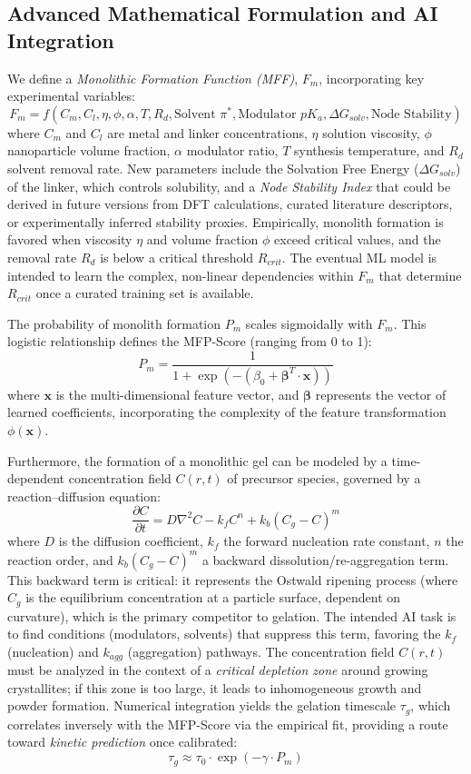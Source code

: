 \documentclass[12pt,a4paper]{article}
\begin{document}
\subsection{Advanced Mathematical Formulation and AI Integration}

We define a \textit{Monolithic Formation Function (MFF)}, $F_m$, incorporating key experimental variables:
\[
F_m = f(C_m, C_l, \eta, \phi, \alpha, T, R_d, \text{Solvent } \pi^*, \text{Modulator } pK_a, \Delta G_{solv}, \text{Node Stability})
\]
where $C_m$ and $C_l$ are metal and linker concentrations, $\eta$ solution viscosity, $\phi$ nanoparticle volume fraction, $\alpha$ modulator ratio, $T$ synthesis temperature, and $R_d$ solvent removal rate. New parameters include the Solvation Free Energy ($\Delta G_{solv}$) of the linker, which controls solubility, and a \textit{Node Stability Index} that could be derived in future versions from DFT calculations, curated literature descriptors, or experimentally inferred stability proxies. Empirically, monolith formation is favored when viscosity $\eta$ and volume fraction $\phi$ exceed critical values, and the removal rate $R_d$ is below a critical threshold $R_{crit}$. The eventual ML model is intended to learn the complex, non-linear dependencies within $F_m$ that determine $R_{crit}$ once a curated training set is available.

The probability of monolith formation $P_m$ scales sigmoidally with $F_m$. This logistic relationship defines the MFP-Score (ranging from 0 to 1):
\[
P_m = \frac{1}{1 + \exp(-(\beta_0 + \mathbf{\beta}^T \cdot \mathbf{x}))}
\]
where $\mathbf{x}$ is the multi-dimensional feature vector, and $\mathbf{\beta}$ represents the vector of learned coefficients, incorporating the complexity of the feature transformation $\phi(\mathbf{x})$.

Furthermore, the formation of a monolithic gel can be modeled by a time-dependent concentration field $C(r, t)$ of precursor species, governed by a reaction–diffusion equation:
\[
\frac{\partial C}{\partial t} = D \nabla^2 C - k_f C^n + k_b(C_g - C)^m
\]
where $D$ is the diffusion coefficient, $k_f$ the forward nucleation rate constant, $n$ the reaction order, and $k_b(C_g - C)^m$ a backward dissolution/re-aggregation term. This backward term is critical: it represents the Ostwald ripening process (where $C_g$ is the equilibrium concentration at a particle surface, dependent on curvature), which is the primary competitor to gelation. The intended AI task is to find conditions (modulators, solvents) that suppress this term, favoring the $k_f$ (nucleation) and $k_{agg}$ (aggregation) pathways. The concentration field $C(r, t)$ must be analyzed in the context of a \textit{critical depletion zone} around growing crystallites; if this zone is too large, it leads to inhomogeneous growth and powder formation. Numerical integration yields the gelation timescale $\tau_g$, which correlates inversely with the MFP-Score via the empirical fit, providing a route toward \textit{kinetic prediction} once calibrated:
\[
\tau_g \approx \tau_0 \cdot \exp\left(-\gamma \cdot P_m\right)
\]
\end{document}
